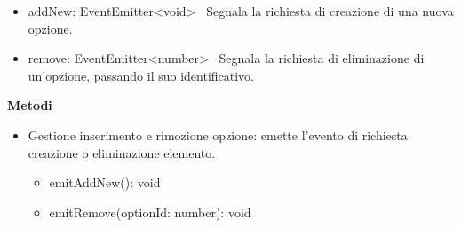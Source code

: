 \documentclass[a4paper,11pt]{article}
\begin{document}
\begin{itemize}[noitemsep, topsep=0pt]
\begin{itemize}[noitemsep, topsep=0pt]
    \item addNew: EventEmitter<void> \
    Segnala la richiesta di creazione di una nuova opzione.

    \item remove: EventEmitter<number> \
    Segnala la richiesta di eliminazione di un'opzione, passando il suo identificativo.
  \end{itemize}
\end{itemize}
\textbf{Metodi}
\begin{itemize}[noitemsep, topsep=0pt]

  \item Gestione inserimento e rimozione opzione: emette l'evento di richiesta creazione o eliminazione elemento.
  \begin{itemize}[noitemsep, topsep=0pt]
    \item emitAddNew(): void
    \item emitRemove(optionId: number): void
  \end{itemize}
\end{itemize}
\end{document}
